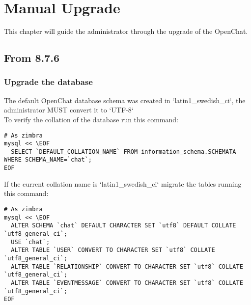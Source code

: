 \chapter{Manual Upgrade}

\noindent This chapter will guide the administrator through the upgrade of the OpenChat.

\section{From 8.7.6}
\subsection{Upgrade the database}
The default OpenChat database schema was created in `latin1\_swedish\_ci`, the administrator MUST convert it to `UTF-8`\\

To verify the collation of the database run this command:
\begin{verbatim}
# As zimbra
mysql << \EOF
  SELECT `DEFAULT_COLLATION_NAME` FROM information_schema.SCHEMATA WHERE SCHEMA_NAME=`chat`;
EOF
\end{verbatim}
If the current collation name is `latin1\_swedish\_ci` migrate the tables running this command:
\begin{verbatim}
# As zimbra
mysql << \EOF
  ALTER SCHEMA `chat` DEFAULT CHARACTER SET `utf8` DEFAULT COLLATE `utf8_general_ci`;
  USE `chat`;
  ALTER TABLE `USER` CONVERT TO CHARACTER SET `utf8` COLLATE `utf8_general_ci`;
  ALTER TABLE `RELATIONSHIP` CONVERT TO CHARACTER SET `utf8` COLLATE `utf8_general_ci`;
  ALTER TABLE `EVENTMESSAGE` CONVERT TO CHARACTER SET `utf8` COLLATE `utf8_general_ci`;
EOF
\end{verbatim}
